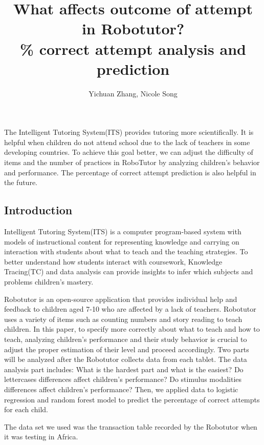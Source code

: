 \documentclass[hyperref]{ctexart}
\title{\textbf{What affects outcome of attempt in Robotutor?\\ \% correct attempt analysis and prediction}}
\author{\sffamily Yichuan Zhang, \sffamily Nicole Song}
\date{}
\begin{document}
	\maketitle
		The Intelligent Tutoring System(ITS) provides tutoring more scientifically. It is helpful when children do not attend school due to the lack of teachers in some developing countries. To achieve this goal better, we can adjust the difficulty of items and the number of practices in RoboTutor by analyzing children's behavior and performance. The percentage of correct attempt prediction is also helpful in the future.\\
		
	\begin{multicols}{2}
	\section{Introduction}
    Intelligent Tutoring System(ITS) is a computer program-based system with models of instructional content for representing knowledge and carrying on interaction with students about what to teach and the teaching strategies. To better understand how students interact with coursework, Knowledge Tracing(TC) and data analysis can provide insights to infer which subjects and problems children's mastery.
    
    
    Robotutor is an open-source application that provides individual help and feedback to children aged 7-10 who are affected by a lack of teachers. Robotutor uses a variety of items such as counting numbers and story reading to teach children. In this paper, to specify more correctly about what to teach and how to teach, analyzing children's performance and their study behavior is crucial to adjust the proper estimation of their level and proceed accordingly. Two parts will be analyzed after the Robotutor collects data from each tablet. The data analysis part includes: What is the hardest part and what is the easiest? Do lettercases differences affect children's performance? Do stimulus modalities differences affect children's performance? Then, we applied data to logistic regression and random forest model to predict the percentage of correct attempts for each child.
    
    
    The data set we used was the transaction table recorded by the Robotutor when it was testing in Africa.


\end{multicols}
\end{document}
